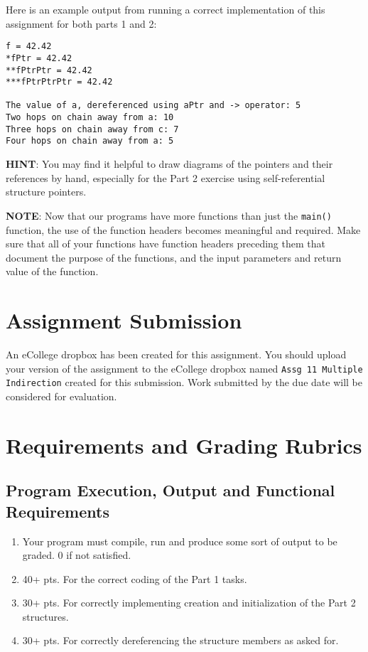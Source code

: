 \documentclass[11pt]{article}
\begin{document}
Here is an example output from running a correct implementation of
this assignment for both parts 1 and 2:


\begin{verbatim}
f = 42.42
*fPtr = 42.42
**fPtrPtr = 42.42
***fPtrPtrPtr = 42.42

The value of a, dereferenced using aPtr and -> operator: 5
Two hops on chain away from a: 10
Three hops on chain away from c: 7
Four hops on chain away from a: 5
\end{verbatim}

\textbf{HINT}: You may find it helpful to draw diagrams of the pointers and
their references by hand, especially for the Part 2 exercise
using self-referential structure pointers.

\textbf{NOTE}: Now that our programs have more functions than just the
\verb~main()~ function, the use of the function headers becomes meaningful
and required.  Make sure that all of your functions have function
headers preceding them that document the purpose of the functions, and
the input parameters and return value of the function.
\section*{Assignment Submission}
\label{sec-4}


An eCollege dropbox has been created for this assignment.  You should
upload your version of the assignment to the eCollege dropbox named
\verb~Assg 11 Multiple Indirection~ created for this submission.  Work
submitted by the due date will be considered for evaluation.
\section*{Requirements and Grading Rubrics}
\label{sec-5}
\subsection*{Program Execution, Output and Functional Requirements}
\label{sec-5-1}


\begin{enumerate}
\item Your program must compile, run and produce some sort of output to
   be graded. 0 if not satisfied.
\item 40+ pts. For the correct coding of the Part 1 tasks.
\item 30+ pts. For correctly implementing creation and initialization of the Part
   2 structures.
\item 30+ pts. For correctly dereferencing the structure members as asked for.
\end{enumerate}
\end{document}
